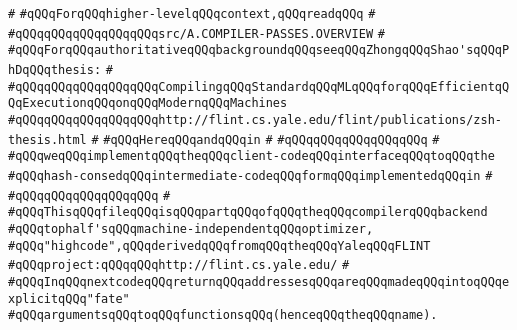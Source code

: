 \verb|#|\newline
\verb|#qQQqForqQQqhigher-levelqQQqcontext,qQQqreadqQQq|\newline
\verb|#|\newline
\verb|#qQQqqQQqqQQqqQQqqQQqsrc/A.COMPILER-PASSES.OVERVIEW|\newline
\verb|#|\newline
\verb|#qQQqForqQQqauthoritativeqQQqbackgroundqQQqseeqQQqZhongqQQqShao'sqQQqPhDqQQqthesis:|\newline
\verb|#|\newline
\verb|#qQQqqQQqqQQqqQQqqQQqCompilingqQQqStandardqQQqMLqQQqforqQQqEfficientqQQqExecutionqQQqonqQQqModernqQQqMachines|\newline
\verb|#qQQqqQQqqQQqqQQqqQQqhttp://flint.cs.yale.edu/flint/publications/zsh-thesis.html|\newline
\verb|#|\newline
\verb|#qQQqHereqQQqandqQQqin|\newline
\verb|#|\newline
\verb|#qQQqqQQqqQQqqQQqqQQq|\newline
\verb|#|\newline
\verb|#qQQqweqQQqimplementqQQqtheqQQqclient-codeqQQqinterfaceqQQqtoqQQqthe|\newline
\verb|#qQQqhash-consedqQQqintermediate-codeqQQqformqQQqimplementedqQQqin|\newline
\verb|#|\newline
\verb|#qQQqqQQqqQQqqQQqqQQq|\newline
\verb|#|\newline
\verb|#qQQqThisqQQqfileqQQqisqQQqpartqQQqofqQQqtheqQQqcompilerqQQqbackend|\newline
\verb|#qQQqtophalf'sqQQqmachine-independentqQQqoptimizer,|\newline
\verb|#qQQq"highcode",qQQqderivedqQQqfromqQQqtheqQQqYaleqQQqFLINT|\newline
\verb|#qQQqproject:qQQqqQQqhttp://flint.cs.yale.edu/|\newline
\verb|#|\newline
\verb|#qQQqInqQQqnextcodeqQQqreturnqQQqaddressesqQQqareqQQqmadeqQQqintoqQQqexplicitqQQq"fate"|\newline
\verb|#qQQqargumentsqQQqtoqQQqfunctionsqQQq(henceqQQqtheqQQqname).|\newline

